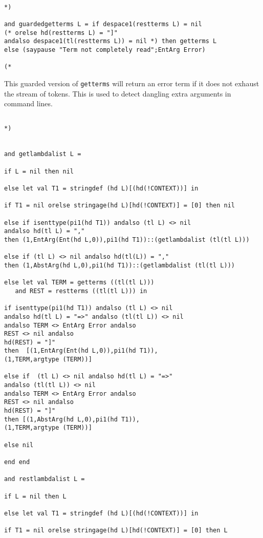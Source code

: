 \documentclass{article}
\begin{document}
\begin{verbatim}

*)

and guardedgetterms L = if despace1(restterms L) = nil 
(* orelse hd(restterms L) = "]" 
andalso despace1(tl(restterms L)) = nil *) then getterms L 
else (saypause "Term not completely read";EntArg Error)

(*

\end{verbatim}

This guarded version of {\tt getterms} will return an error term if it does not exhaust the stream of tokens.  This is used to detect dangling extra arguments in command lines.

\begin{verbatim}

*)


and getlambdalist L =

if L = nil then nil

else let val T1 = stringdef (hd L)[(hd(!CONTEXT))] in

if T1 = nil orelse stringage(hd L)[hd(!CONTEXT)] = [0] then nil

else if isenttype(pi1(hd T1)) andalso (tl L) <> nil 
andalso hd(tl L) = "," 
then (1,EntArg(Ent(hd L,0)),pi1(hd T1))::(getlambdalist (tl(tl L)))

else if (tl L) <> nil andalso hd(tl(L)) = "," 
then (1,AbstArg(hd L,0),pi1(hd T1))::(getlambdalist (tl(tl L)))

else let val TERM = getterms ((tl(tl L))) 
   and REST = restterms ((tl(tl L))) in

if isenttype(pi1(hd T1)) andalso (tl L) <> nil 
andalso hd(tl L) = "=>" andalso (tl(tl L)) <> nil 
andalso TERM <> EntArg Error andalso
REST <> nil andalso
hd(REST) = "]" 
then  [(1,EntArg(Ent(hd L,0)),pi1(hd T1)),
(1,TERM,argtype (TERM))]

else if  (tl L) <> nil andalso hd(tl L) = "=>" 
andalso (tl(tl L)) <> nil 
andalso TERM <> EntArg Error andalso
REST <> nil andalso
hd(REST) = "]" 
then [(1,AbstArg(hd L,0),pi1(hd T1)),
(1,TERM,argtype (TERM))]

else nil

end end

and restlambdalist L =

if L = nil then L

else let val T1 = stringdef (hd L)[(hd(!CONTEXT))] in

if T1 = nil orelse stringage(hd L)[hd(!CONTEXT)] = [0] then L


\end{verbatim}
\end{document}
